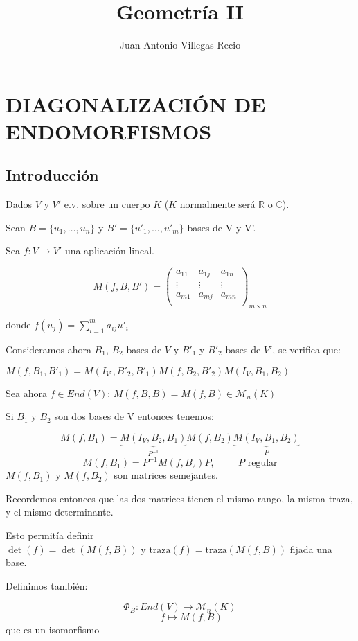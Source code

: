 \documentclass[x11names,table]{report}
\title{Geometría II}
\author{Juan Antonio Villegas Recio}
\date{}
\begin{document}
\maketitle
\chapter{DIAGONALIZACIÓN DE ENDOMORFISMOS}

\section{Introducción}

Dados $V$ y $V'$ e.v. sobre un cuerpo $K$ ($K$ normalmente será $\mathbb{R}$ o $\mathbb{C}$).

Sean $B=\{u_1, \dots ,u_n\}$ y $B'=\{u'_1, \dots ,u'_m\}$ bases de V y V'.

Sea $f:V\longrightarrow V'$ una aplicación lineal.


\[
M(f,B,B')=\begin{pmatrix}
a_{11} & a_{1j} & a_{1n}\\
\vdots & \vdots & \vdots\\
a_{m1} & a_{mj} & a_{mn}\\
\end{pmatrix}_{m\times n}
\]

donde $f(u_j)=\sum_{i=1}^{m} a_{ij}u'_i$

Consideramos ahora $B_1$, $B_2$ bases de $V$ y $B'_1$ y $B'_2$ bases de $V'$, se verifica que:

$M(f,B_1,B'_1)=M(I_{V'},B'_2,B'_1)M(f,B_2,B'_2)M(I_V,B_1,B_2)$
\medskip

Sea ahora $f\in End(V)$: $M(f,B,B)=M(f,B)\in \mathcal{M}_n(K)$
\medskip

Si $B_1$ y $B_2$ son dos bases de V entonces tenemos:

\medskip
\[ 
M(f,B_1)=\underbrace{M(I_{V},B_2,B_1)}_{P^{-1}}M(f,B_2)\underbrace{M(I_V,B_1,B_2)}_P
\]\[
M(f,B_1)=P^{-1}M(f,B_2)P, \hspace{1cm} P \text{ regular}
\]
$M(f,B_1)\text{ y } M(f,B_2)$ son matrices semejantes.

Recordemos entonces que las dos matrices tienen el mismo rango, la misma traza, y el mismo determinante.

Esto permitía definir $\det(f)=\det(M(f,B)) \text{ y } \text{traza}(f)=\text{traza}(M(f,B))$ fijada una base.

Definimos también:

\[
\Phi_B:End(V)\longrightarrow \mathcal{M}_n(K)
\]\[
\hspace{1cm} f\longmapsto M(f,B)
\]
que es un isomorfismo
\end{document}
